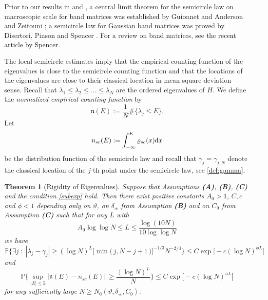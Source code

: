 \documentclass[draft]{article}
\newcommand{\ttau}{\vartheta}
\newcommand{\rd}{{\rm d}}
\newcommand{\be}{\begin{equation}}
\newcommand{\ee}{\end{equation}}
\newcommand{\la}{\lambda}
\renewcommand{\P}{{\mathbb P}}
\newtheorem{theorem}{Theorem}
\numberwithin{equation}{section}
\numberwithin{theorem}{section}
\numberwithin{definition}{section}
\numberwithin{remark}{section}
\begin{document}
Prior  to our results in \cite{EYY} and \cite{EYY2}, a central limit theorem  for
the semicircle law on macroscopic scale for band matrices was established
by Guionnet \cite{gui} and Anderson and Zeitouni \cite{AZ}; a
 semicircle law  for Gaussian band matrices  was proved 
by Disertori, Pinson and Spencer \cite{DPS}.
 For a review on band matrices, see  the recent  article \cite{Spe} by Spencer.



The local semicircle estimates imply that the empirical counting function of
the eigenvalues is close to the semicircle counting function 
and that the locations of the eigenvalues are close to their classical 
location in mean square deviation sense.
Recall that $\la_1\le \la_2 \le \ldots \le \la_N$ are the ordered
eigenvalues of $H$.
We define the {\it normalized empirical counting function}  by
\be
 {\mathfrak n}(E):= \frac{1}{N}\# \{ \lambda_j\le E\}.
\label{deffn}
\ee
Let
\be
 n_{sc}(E) :  = \int_{-\infty}^E \varrho_{sc}(x)\rd x
\label{nsc}
\ee
be the distribution function
of the semicircle law and recall that $\gamma_j =\gamma_{j,N}$ denote the 
classical location of the $j$-th point
under the semicircle law, see \eqref{def:gamma}.




\begin{theorem} [Rigidity of Eigenvalues] \label{7.1}
Suppose that Assumptions {\bf (A)}, {\bf (B)}, {\bf (C)}  and  the condition \eqref{subexp} hold. 
Then  there exist positive constants   $A_0 > 1$, $C, c$ and $\phi < 1$  
depending only on $\ttau$, on $\delta_\pm$ from Assumption {\bf (B)} and
on $C_0$ from Assumption {\bf (C)}
such that  for  any $L$ with 
$$
A_0\log\log N\le L\le \frac{\log (10 N)}{10\log\log N}
$$
we have
\be\label{rigidity}
\P \Bigg\{  \exists j\; : \; |\lambda_j-\gamma_j| 
\ge (\log N)^{ L}  \Big [ \min \big ( \, j ,  N-j+1 \,  \big) \Big  ]^{-1/3}   N^{-2/3} \Bigg\}
 \le  C\exp{\big[-c(\log N)^{\phi L} \big]}
\ee
and
\be
   \P\Bigg\{ \sup_{|E|\le 5} \big| {\mathfrak n} (E)-n_{sc}(E)\big| \,  \ge
 \frac{(\log N)^{L}}{N} \Bigg\}\le  C\exp{\big[-c(\log N)^{\phi L } \big]}  
\label{nn}
\ee
for any sufficiently large $N\ge N_0(\ttau, \delta_\pm, C_0)$. 
\end{theorem}
\end{document}
